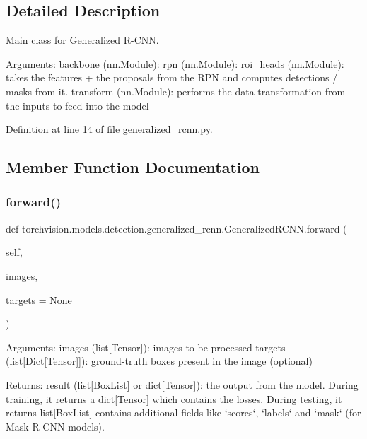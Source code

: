 \subsection{Detailed Description}
\begin{DoxyVerb}Main class for Generalized R-CNN.

Arguments:
    backbone (nn.Module):
    rpn (nn.Module):
    roi_heads (nn.Module): takes the features + the proposals from the RPN and computes
        detections / masks from it.
    transform (nn.Module): performs the data transformation from the inputs to feed into
        the model
\end{DoxyVerb}
 

Definition at line 14 of file generalized\+\_\+rcnn.\+py.



\subsection{Member Function Documentation}
\mbox{\label{classtorchvision_1_1models_1_1detection_1_1generalized__rcnn_1_1GeneralizedRCNN_a7d27936056f516d9a310f5b0746f7cda}} 
\subsubsection{\texorpdfstring{forward()}{forward()}}
{\footnotesize\ttfamily def torchvision.\+models.\+detection.\+generalized\+\_\+rcnn.\+Generalized\+R\+C\+N\+N.\+forward (\begin{DoxyParamCaption}\item[{}]{self,  }\item[{}]{images,  }\item[{}]{targets = {\ttfamily None} }\end{DoxyParamCaption})}

\begin{DoxyVerb}Arguments:
    images (list[Tensor]): images to be processed
    targets (list[Dict[Tensor]]): ground-truth boxes present in the image (optional)

Returns:
    result (list[BoxList] or dict[Tensor]): the output from the model.
During training, it returns a dict[Tensor] which contains the losses.
During testing, it returns list[BoxList] contains additional fields
like `scores`, `labels` and `mask` (for Mask R-CNN models).\end{DoxyVerb}
 

